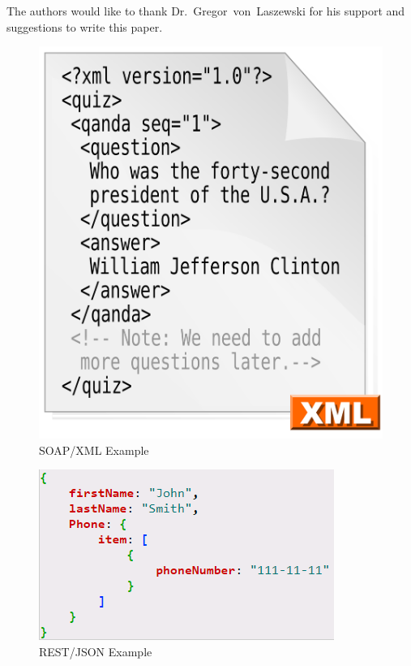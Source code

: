 \begin{acks}

  The authors would like to thank Dr.~Gregor~von~Laszewski for his
  support and suggestions to write this paper.

\end{acks}


 

\begin{figure}[!ht]
  \centering\includegraphics[width=\columnwidth]{images/xml-example.png}
  \caption{SOAP/XML Example}\label{f:xml-example}
\end{figure}

\begin{figure}[!ht]
  \centering\includegraphics[width=\columnwidth]{images/json-rest-example.png}
  \caption{REST/JSON Example}\label{f:rest-example}
\end{figure}

